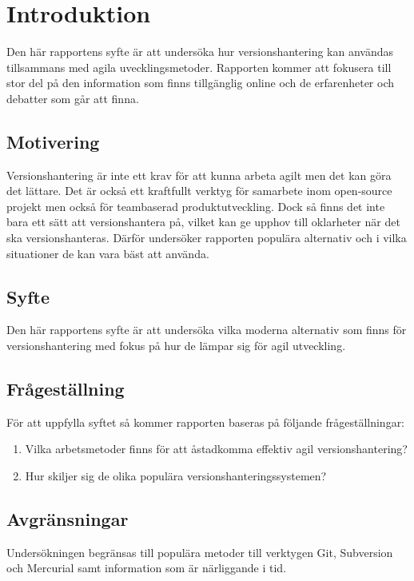 \section{Introduktion}
\label{sec:bjorn-introduction}

Den här rapportens syfte är att undersöka hur versionshantering kan användas tillsammans med agila uvecklingsmetoder. Rapporten kommer att fokusera till stor del på den information som finns tillgänglig online och de erfarenheter och debatter som går att finna.

\subsection{Motivering}
\label{subsec:motivation}

Versionshantering är inte ett krav för att kunna arbeta agilt men det kan göra det lättare. Det är också ett kraftfullt verktyg för samarbete inom open-source projekt men också för teambaserad produktutveckling. Dock så finns det inte bara ett sätt att versionshantera på, vilket kan ge upphov till oklarheter när det ska versionshanteras. Därför undersöker rapporten populära alternativ och i vilka situationer de kan vara bäst att använda.

\subsection{Syfte}
\label{subsec:reason}
Den här rapportens syfte är att undersöka vilka moderna alternativ som finns för versionshantering med fokus på hur de lämpar sig för agil utveckling.

\subsection{Frågeställning}
\label{subsec:research-questions}

För att uppfylla syftet så kommer rapporten baseras på följande frågeställningar:

\begin{enumerate}
\item Vilka arbetsmetoder finns för att åstadkomma effektiv agil versionshantering?

\item Hur skiljer sig de olika populära versionshanteringssystemen?
\end{enumerate}




\subsection{Avgränsningar}
\label{subsec:delimitations}

Undersökningen begränsas till populära metoder till verktygen Git, Subversion och Mercurial samt information som är närliggande i tid.
